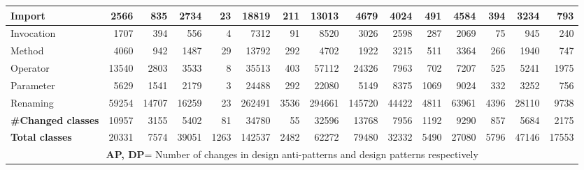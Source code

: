 \begin{landscape}
\begin{center}
\begin{table*}
{\begin{tabular}{|p{2.7cm}|r|r|r|r|r|r|r|r|r|r|r|r|r|r|}
			Import & 2566 &	835 & 2734	& 23 & 18819 & 211 & 13013 & 4679 &	4024 & 491 & 4584& 394&3234 &793	    \\ \hline
			Invocation & 1707 & 394	& 556 & 4 & 7312 & 91 &	8520 & 3026	& 2598	& 287 & 2069 & 75 &945 &240	    \\ \hline
			Method & 4060 &	942 & 1487	& 29 & 13792 & 292 & 4702 &	1922 & 3215	& 511 & 3364 & 266 & 1940&747	\\ \hline 
			Operator & 13540 & 2803	& 3533	& 8	& 35513	& 403 &	57112 &	24326 &	7963 & 702 & 7207& 525& 5241&1975	\\ \hline 
			Parameter & 5629 & 1541	& 2179	& 3 & 24488	& 292 &	22080 &	5149 & 8375 & 1069  & 9024& 332&3252 &756	\\ \hline 
			Renaming & 59254 & 14707 & 16259 & 23 &	262491 &3536 &294661&145720& 44422 & 4811 & 63961& 4396&28110&9738	\\ \hline 
			\textbf{\#Changed classes} & 10957 & 3155 & 5402& 81 & 34780 & 55 & 32596 & 13768 & 7956& 1192 & 9290& 857& 5684&2175	\\ \hline
			\textbf{Total classes} & 20331 &	7574 &	39051 &	1263 & 142537 & 2482 & 62272 & 79480 & 32332 & 5490 & 27080 & 5796 & 47146&17553	\\ \hline
			\multicolumn{15}{c}{\textbf{AP, DP}= Number of changes in design anti-patterns and design patterns respectively}\\ \hline	
		\end{tabular}
		}
	\end{table*}
	

\end{center}
\end{landscape}
